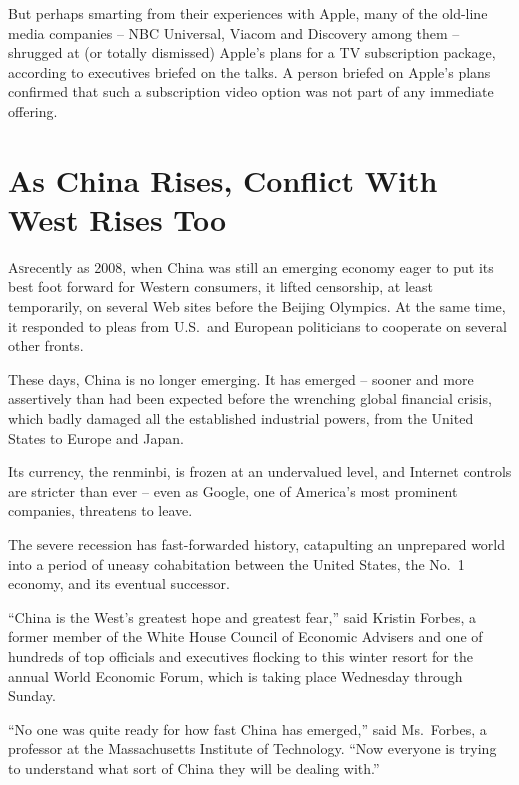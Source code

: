 ﻿\documentclass[12pt]{article}
\begin{document}
But perhaps smarting from their experiences with Apple, many of the old-line media companies -- NBC
Universal, Viacom and Discovery among them -- shrugged at (or totally dismissed) Apple's plans for a
TV subscription package, according to executives briefed on the talks. A person briefed on Apple's
plans confirmed that such a subscription video option was not part of any immediate offering.

\section{As China Rises, Conflict With West Rises Too}

\lettrine{A}{s}recently as 2008, when China was still an emerging economy
eager to put its best foot forward for Western consumers, it lifted censorship, at least
temporarily, on several Web sites before the Beijing Olympics. At the same time, it responded to
pleas from U.S.~and European politicians to cooperate on several other fronts.

These days, China is no longer emerging. It has emerged -- sooner and more assertively than had been
expected before the wrenching global financial crisis, which badly damaged all the established
industrial powers, from the United States to Europe and Japan.

Its currency, the renminbi, is frozen at an undervalued level, and Internet controls are stricter
than ever -- even as Google, one of America's most prominent companies, threatens to leave.


The severe recession has fast-forwarded history, catapulting an unprepared world into a period of
uneasy cohabitation between the United States, the No.~1 economy, and its eventual successor.

``China is the West's greatest hope and greatest fear,'' said Kristin Forbes, a former member of the
White House Council of Economic Advisers and one of hundreds of top officials and executives
flocking to this winter resort for the annual World Economic Forum, which is taking place Wednesday
through Sunday.

``No one was quite ready for how fast China has emerged,'' said Ms.~Forbes, a professor at the
Massachusetts Institute of Technology. ``Now everyone is trying to understand what sort of China
they will be dealing with.''
\end{document}
